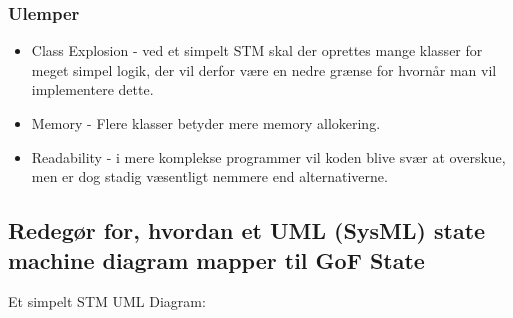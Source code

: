 \subsubsection{Ulemper}
\begin{itemize}
	\item Class Explosion - ved et simpelt STM skal der oprettes mange klasser for meget simpel logik, der vil derfor være en nedre grænse for hvornår man vil implementere dette.
	\item Memory - Flere klasser betyder mere memory allokering.
	\item Readability - i mere komplekse programmer vil koden blive svær at overskue, men er dog stadig væsentligt nemmere end alternativerne.
\end{itemize}


\subsection{Redegør for, hvordan et UML (SysML) state machine diagram mapper til GoF State}

Et simpelt STM UML Diagram:



